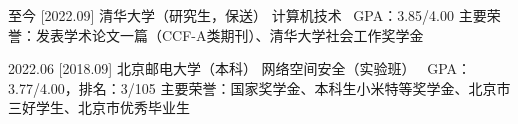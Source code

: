 \documentclass[zh]{resume}
\begin{document}
\makeheader

\begin{educations}
  \education%
    {至今}%
    [2022.09]%
    {清华大学（研究生，保送）}%
    {计算机技术 \textbullet\ GPA：3.85/4.00}%
    {}{主要荣誉：发表学术论文一篇（CCF-A类期刊）、清华大学社会工作奖学金}

  \separator{0.1ex}
  \education%
    {2022.06}%
    [2018.09]%
    {北京邮电大学（本科）}%
    {网络空间安全（实验班） \textbullet\ GPA：3.77/4.00，排名：3/105}%
    {}{主要荣誉：国家奖学金、本科生小米特等奖学金、北京市三好学生、北京市优秀毕业生}

\end{educations}
\end{document}
